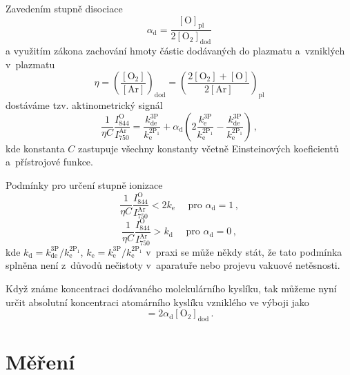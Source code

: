 \documentclass[12pt]{article}
\begin{document}
Zavedením stupně disociace
%
\begin{equation}
\alpha_\mathrm{d} = \frac{[\mathrm{O}]_\mathrm{pl}}{2[\mathrm{O}_2]_\mathrm{dod}}
\end{equation}
%
a využitím zákona zachování hmoty částic dodávaných do plazmatu a~vzniklých v~plazmatu
%
\begin{equation}
\eta = \left( \frac{[\mathrm{O}_2]}{[\mathrm{Ar}]} \right)_\mathrm{dod}
 = \left( \frac{2[\mathrm{O}_2] + [\mathrm{O}]}{2[\mathrm{Ar}]} \right)_\mathrm{pl}
\end{equation}
%
dostáváme tzv. aktinometrický signál
%
\begin{equation}
\frac{1}{\eta C}
\frac{I_{844}^\mathrm{O}}{I_{750}^\mathrm{Ar}} = 
\frac{k_\mathrm{de}^\mathrm{3P}}{k_\mathrm{e}^\mathrm{2P_1}} + 
\alpha_\mathrm{d}
\left(
2\frac{k_\mathrm{e}^\mathrm{3P}}{k_\mathrm{e}^\mathrm{2P_1}} - 
\frac{k_\mathrm{de}^\mathrm{3P}}{k_\mathrm{e}^\mathrm{2P_1}}
\right) \, \mathrm{,}
\end{equation}
%
kde konstanta $C$ zastupuje všechny konstanty včetně Einsteinových koeficientů a~přístrojové funkce.

Podmínky pro určení stupně ionizace
%
\begin{equation}
\frac{1}{\eta C}
\frac{I_{844}^\mathrm{O}}{I_{750}^\mathrm{Ar}} < 2k_\mathrm{e} 
 \,\,\,\,\,\,\,\, \mathrm{pro} \,\, \alpha_\mathrm{d}=1 \,\mathrm{,}
\label{podm1}
\end{equation}
%
%
\begin{equation}
\frac{1}{\eta C}
\frac{I_{844}^\mathrm{O}}{I_{750}^\mathrm{Ar}} > k_\mathrm{d} 
 \,\,\,\,\,\,\,\, \mathrm{pro} \,\, \alpha_\mathrm{d}=0 \,\mathrm{,}
\label{podm2}
\end{equation}
%
kde $k_\mathrm{d} = k_\mathrm{de}^\mathrm{3P}/k_\mathrm{e}^\mathrm{2P_1}$, $k_\mathrm{e} = k_\mathrm{e}^\mathrm{3P}/k_\mathrm{e}^\mathrm{2P_1}$ v~praxi se může někdy stát, že tato podmínka splněna není z~důvodů nečistoty v~aparatuře nebo projevu vakuové netěsnosti.

Když známe koncentraci dodávaného molekulárního kyslíku, tak můžeme nyní určit absolutní koncentraci atomárního kyslíku vzniklého ve výboji jako
%
\begin{equation}
[\mathrm{O}] = 2 \alpha_\mathrm{d}[\mathrm{O}_2]_\mathrm{dod} \,\mathrm{.}
\end{equation}
%



\section{Měření}
\end{document}
